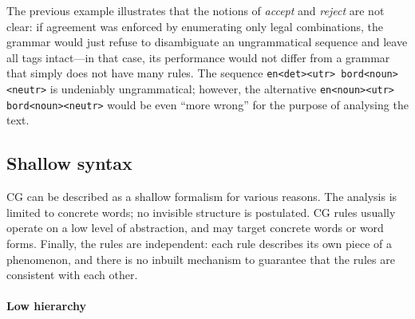 The previous example illustrates that the notions of \emph{accept} and \emph{reject} are not clear: if agreement was enforced
by enumerating only legal combinations, the grammar would just refuse to disambiguate
an ungrammatical sequence and leave all tags intact---in that case,
its performance would not differ from a grammar that simply does not have many rules.
The sequence \verb!en<det><utr> bord<noun><neutr>! is undeniably ungrammatical; however, the alternative \verb!en<noun><utr> bord<noun><neutr>! would be even ``more wrong'' for the purpose of analysing the text.




\subsection{Shallow syntax}\label{shallow-syntax}

CG can be described as a shallow formalism for various reasons. 
The analysis is limited to concrete words; no invisible structure is postulated.
CG rules usually operate on a low level of abstraction, and may target concrete words or word forms.
Finally, the rules are independent: each rule describes its own piece of a phenomenon, and there is no inbuilt mechanism to guarantee that the rules are consistent with each other.



\paragraph{Low hierarchy}


